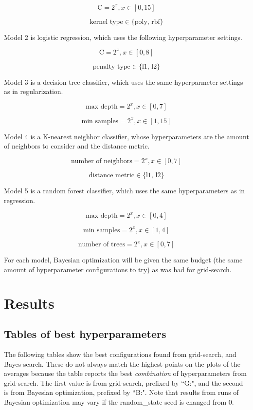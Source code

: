 \documentclass[12pt, letterpaper]{article}
\begin{document}
$$
\text{C} = 2^x, x \in [0,15]
$$

$$
\text{kernel type} \in \{\text{poly, rbf}\}
$$

Model 2 is logistic regression, which uses the following hyperparameter settings.

$$
\text{C} = 2^x, x \in [0,8]
$$

$$
\text{penalty type} \in \{\text{l1, l2}\}
$$

Model 3 is a decision tree classifier, which uses the same hyperparmeter settings as in regularization.

$$
\text{max depth} = 2^x, x \in [0,7]
$$

$$
\text{min samples} = 2^x, x \in [1,15]
$$

Model 4 is a K-nearest neighbor classifier, whose hyperparameters are the amount of neighbors to consider and the distance metric.

$$
\text{number of neighbors} = 2^x, x \in [0,7]
$$

$$
\text{distance metric} \in \{\text{l1, l2}\}
$$

Model 5 is a random forest classifier, which uses the same hyperparameters as in regression.

$$
\text{max depth} = 2^x, x \in [0,4]
$$

$$
\text{min samples} = 2^x, x \in [1,4]
$$

$$
\text{number of trees} = 2^x, x \in [0,7]
$$

For each model, Bayesian optimization will be given the same budget (the same amount of hyperparameter configurations to try) as was had for grid-search.

\section{Results} %

\subsection{Tables of best hyperparameters}

The following tables show the best configurations found from grid-search, and Bayes-search. These do not always match the highest points on the plots of the averages because the table reports the best \emph{combination} of hyperparameters from grid-search. The first value is from grid-search, prefixed by ``G:", and the second is from Bayesian optimization, prefixed by ``B:". Note that results from runs of Bayesian optimization may vary if the random\_state seed is changed from 0.
\end{document}
